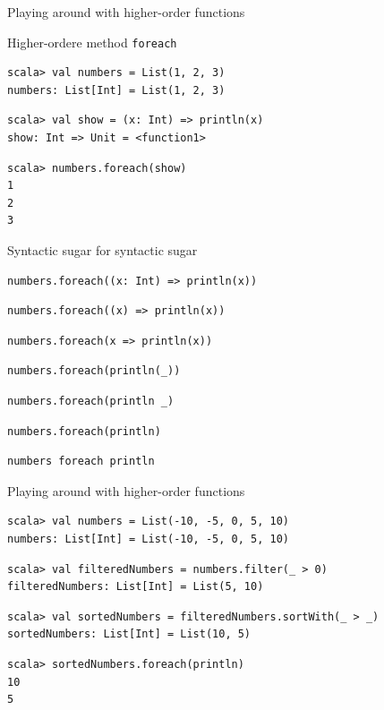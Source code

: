 \begin{frame}[fragile]{Playing around with higher-order functions}
\begin{exampleblock}{Higher-ordere method \lstinline!foreach!}
\begin{lstlisting}
scala> val numbers = List(1, 2, 3)
numbers: List[Int] = List(1, 2, 3)
\end{lstlisting}
\pause
\begin{lstlisting}
scala> val show = (x: Int) => println(x)
show: Int => Unit = <function1>
\end{lstlisting}
\pause
\begin{lstlisting}
scala> numbers.foreach(show)
1
2
3
\end{lstlisting}
\end{exampleblock}
\end{frame}

\begin{frame}[fragile]{Syntactic sugar for syntactic sugar}
\begin{lstlisting}
numbers.foreach((x: Int) => println(x))
\end{lstlisting}
\pause
\begin{lstlisting}
numbers.foreach((x) => println(x))
\end{lstlisting}
\pause
\begin{lstlisting}
numbers.foreach(x => println(x))
\end{lstlisting}
\pause
\begin{lstlisting}
numbers.foreach(println(_))
\end{lstlisting}
\pause
\begin{lstlisting}
numbers.foreach(println _)
\end{lstlisting}
\pause
\begin{lstlisting}
numbers.foreach(println)
\end{lstlisting}
\pause
\begin{lstlisting}
numbers foreach println
\end{lstlisting}
\end{frame}

\begin{frame}[fragile]{Playing around with higher-order functions}
\begin{lstlisting}
scala> val numbers = List(-10, -5, 0, 5, 10)
numbers: List[Int] = List(-10, -5, 0, 5, 10)
\end{lstlisting}
\pause
\begin{lstlisting}
scala> val filteredNumbers = numbers.filter(_ > 0)
filteredNumbers: List[Int] = List(5, 10)
\end{lstlisting}
\pause
\begin{lstlisting}
scala> val sortedNumbers = filteredNumbers.sortWith(_ > _)
sortedNumbers: List[Int] = List(10, 5)
\end{lstlisting}
\pause
\begin{lstlisting}
scala> sortedNumbers.foreach(println)
10
5
\end{lstlisting}
\end{frame}

